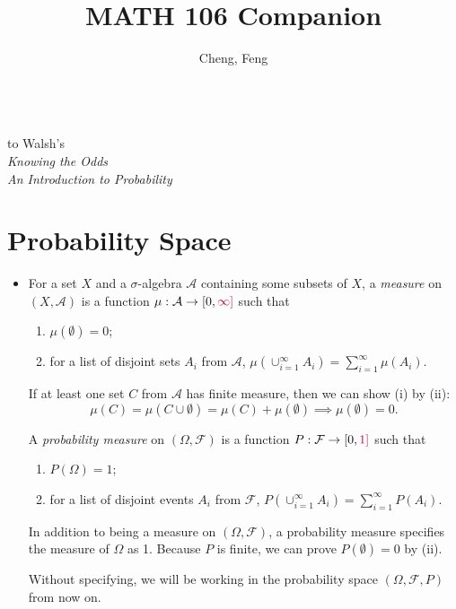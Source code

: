 \documentclass[11pt]{article}
\title{MATH 106 Companion}
\author{Cheng, Feng}
\newcommand{\df}[1]{\textit{\textsf{#1}}} %
\newcommand{\F}{\mathcal{F}} %
\newcommand{\A}{\mathcal{A}}
\newcommand{\tpurp}[1]{\textcolor{purple}{#1}}
\begin{document}
\makeatletter
\begin{center}
    {\Large \@title}
    \\ to Walsh's \\ \textit{Knowing the Odds \\ An Introduction to Probability}
    \vspace{0.5em}
    \\ \@author
    \vspace{-0.5em}
\end{center}
\makeatother

\section{Probability Space}
\begin{itemize}
    \item For a set $X$ and a $\sigma$-algebra $\A$ containing some subsets of $X$, a \df{measure} on $(X,\A)$ is a function $\mu: \A \to [0, \tpurp{\infty]}$ such that 
    \begin{enumerate}[label=(\roman*)]
        \item $\mu(\emptyset)=0$;
        \item for a list of disjoint sets $A_i$ from $\A$, $\mu(\cup_{i=1}^\infty A_i) = \sum_{i=1}^\infty \mu(A_i)$.
    \end{enumerate}
    If at least one set $C$ from $\A$ has finite measure, then we can show (i) by (ii): \[\mu(C) = \mu(C \cup \emptyset) = \mu(C) + \mu(\emptyset) \implies \mu(\emptyset) = 0.\]
    
    A \df{probability measure} on $(\Omega, \F)$ is a function $P: \F \to [0,\tpurp{1]}$ such that 
    \begin{enumerate}[label=(\roman*)]
        \item $P(\Omega) = 1$;
        \item for a list of disjoint events $A_i$ from $\F$, $P(\cup_{i=1}^\infty A_i) = \sum_{i=1}^\infty P(A_i)$.
    \end{enumerate}
    In addition to being a measure on $(\Omega, \F)$, a probability measure specifies the measure of $\Omega$ as 1. Because $P$ is finite, we can prove $P(\emptyset) = 0$ by (ii).
    
    Without specifying, we will be working in the probability space $(\Omega, \F, P)$ from now on.
\end{itemize}
\end{document}
